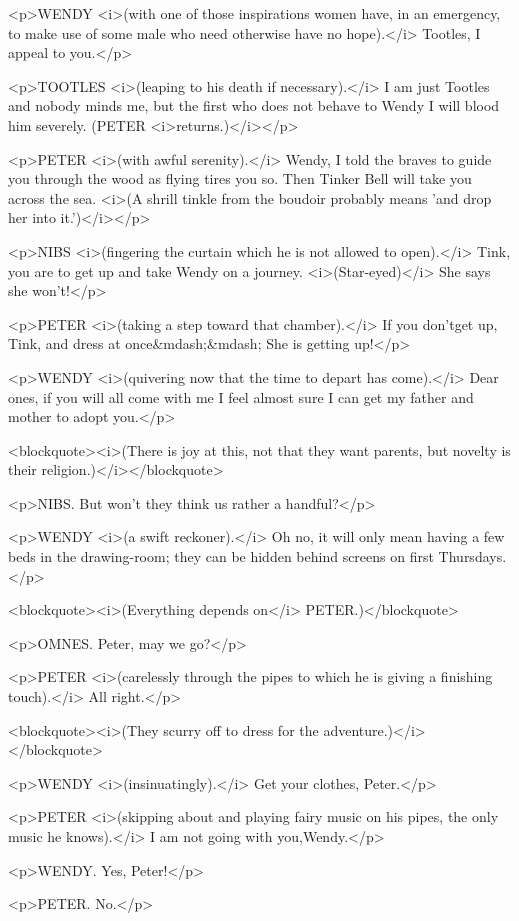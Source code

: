 <p>WENDY <i>(with one of those inspirations women have, in an
emergency, to make use of some male who need otherwise have no
hope).</i> Tootles, I appeal to you.</p>

<p>TOOTLES <i>(leaping to his death if necessary).</i> I am just
Tootles and nobody minds me, but the first who does not behave to
Wendy I will blood him severely. (PETER <i>returns.)</i></p>

<p>PETER <i>(with awful serenity).</i> Wendy, I told the braves to
guide you through the wood as flying tires you so. Then Tinker Bell
will take you across the sea. <i>(A shrill tinkle from the boudoir
probably means 'and drop her into it.')</i></p>

<p>NIBS <i>(fingering the curtain which he is not allowed to
open).</i> Tink, you are to get up and take Wendy on a journey.
<i>(Star-eyed)</i> She says she won't!</p>

<p>PETER <i>(taking a step toward that chamber).</i> If you don'tget
up, Tink, and dress at once&mdash;&mdash; She is getting up!</p>

<p>WENDY <i>(quivering now that the time to depart has come).</i>
Dear ones, if you will all come with me I feel almost sure I can get
my father and mother to adopt you.</p>

<blockquote><i>(There is joy at this, not that they want parents, but
novelty is their religion.)</i></blockquote>

<p>NIBS. But won't they think us rather a handful?</p>

<p>WENDY <i>(a swift reckoner).</i> Oh no, it will only mean having a
few beds in the drawing-room; they can be hidden behind screens on
first Thursdays.</p>

<blockquote><i>(Everything depends on</i> PETER.)</blockquote>

<p>OMNES. Peter, may we go?</p>

<p>PETER <i>(carelessly through the pipes to which he is giving a
finishing touch).</i> All right.</p>

<blockquote><i>(They scurry off to dress for the
adventure.)</i></blockquote>

<p>WENDY <i>(insinuatingly).</i> Get your clothes, Peter.</p>

<p>PETER <i>(skipping about and playing fairy music on his pipes, the
only music he knows).</i> I am not going with you,Wendy.</p>

<p>WENDY. Yes, Peter!</p>

<p>PETER. No.</p>

